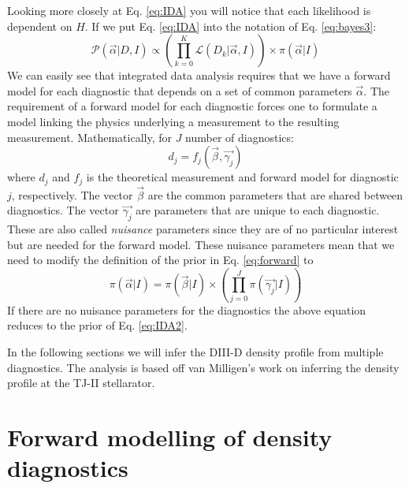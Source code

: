 \documentclass[12pt]{article}
\numberwithin{equation}{section}
\begin{document}
Looking more closely at Eq. \ref{eq:IDA} you will notice that each likelihood is dependent on $H$. 
If we put Eq. \ref{eq:IDA} into the notation of Eq. \ref{eq:bayes3}:
\begin{equation} \label{eq:IDA2}
	  {\mathcal{P}(\vec{\alpha}|D,I)} \propto {\left( \prod\limits_{k=0}^K{\mathcal{L}(D_k|\vec{\alpha},I)} \right)} \times 
	  {\pi(\vec{\alpha}|I)}
\end{equation}
We can easily see that integrated data analysis requires that we have a forward model for each diagnostic that depends on a set of common parameters $\vec{\alpha}$. The requirement of a forward model for each diagnostic forces one to formulate a model linking the physics underlying a measurement to the resulting measurement. Mathematically, for $J$ number of diagnostics:
\begin{equation} \label{eq:forward}
	d_j = f_j(\vec{\beta},\vec{\gamma_j})
\end{equation}
where $d_j$ and $f_j$ is the theoretical measurement and forward model for diagnostic $j$, respectively. The vector $\vec{\beta}$ are the common parameters that are shared between diagnostics. The vector $\vec{\gamma_j}$ are parameters that are unique to each diagnostic. These are also called \emph{nuisance} parameters since they are of no particular interest but are needed for the forward model. These nuisance parameters mean that we need to modify the definition of the prior in Eq. \ref{eq:forward} to 
\begin{equation} \label{eq:forwardprior}
	\pi ( \vec{\alpha} | I ) = \pi ( \vec{\beta}|I) \times \left( \prod \limits_{j=0}^{J} \pi ( \vec{\gamma_j}|I) \right)
\end{equation}
If there are no nuisance parameters for the diagnostics the above equation reduces to the prior of Eq. \ref{eq:IDA2}.

In the following sections we will infer the DIII-D density profile from multiple diagnostics. The analysis is based off van Milligen's work on inferring the density profile at the TJ-II stellarator.\cite{van2011integrated} 

\section{Forward modelling of density diagnostics}
\end{document}
